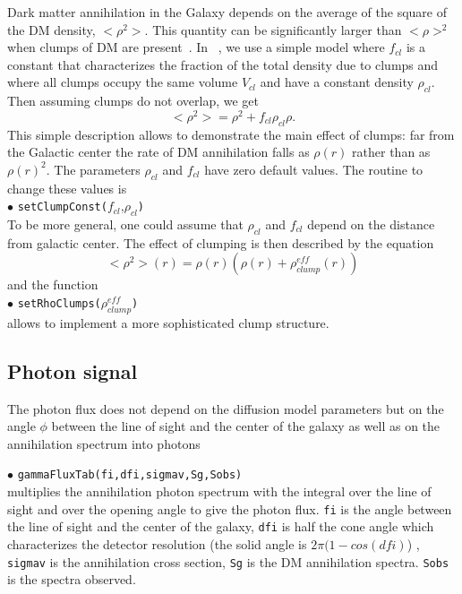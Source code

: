 \documentclass[12pt,a4paper]{article}
\begin{document}
Dark matter annihilation in the Galaxy depends on the average of the square of the DM density, $<\rho^2>$. This quantity 
can be significantly larger than $<\rho>^2$ when clumps of DM are present~\cite{Lavalle:2006vb}.  
In \micro~,   we use  a simple model where $f_{cl}$ is a constant 
that characterizes the fraction of the total density due to clumps
 and  where all clumps occupy  the
same volume $V_{cl}$ and have a constant density $\rho_{cl}$. Then assuming  clumps do not  overlap, we get 
\begin{equation} 
    <\rho^2> = \rho^2 +  f_{cl}\rho_{cl}\rho .
\end{equation}
This simple description allows to  demonstrate  the main effect of clumps:  far from the Galactic center the rate of DM annihilation falls as $\rho(r)$ rather than as
$\rho(r)^2$. The parameters $\rho_{cl}$  and  $f_{cl}$ have zero default values.  
The routine to change these values is \\
 \noindent $\bullet$ \verb|setClumpConst(|$f_{cl}$,$\rho_{cl}$\verb|)| \\
To be more general, one could assume that $\rho_{cl}$  and  $f_{cl}$  depend on the distance from galactic center. The effect of clumping  is then described  by the equation 
\begin{equation}
<\rho^2>(r)=\rho(r)(\rho(r) +  \rho_{clump}^{eff}(r))
\end{equation}
and the function \\
\noindent $\bullet$ \verb|setRhoClumps(|$\rho_{clump}^{eff}$\verb|)|\\
allows to implement a more sophisticated clump  structure.


\subsection{Photon  signal}
The photon  flux does not depend on the  diffusion model parameters but on the angle
$\phi$ between the line of sight and the center of the galaxy as well as on the annihilation spectrum
into photons

\noindent
$\bullet$ \verb|gammaFluxTab(fi,dfi,sigmav,Sg,Sobs)|\\
multiplies the annihilation photon spectrum  with the integral over the line of sight
and over the opening angle to give the photon flux. 
\verb|fi| is the angle between the line of sight and the center of the
galaxy,   \verb|dfi| is half the cone angle which characterizes the detector resolution
(the solid angle is  $2\pi (1-cos(dfi)$) ,  
 \verb|sigmav| is the annihilation cross section, \verb|Sg| is the DM annihilation spectra.
\verb|Sobs| is the spectra observed.
\end{document}
